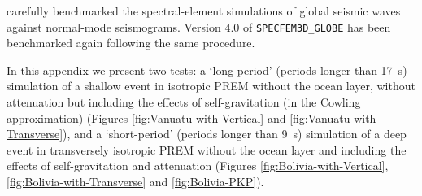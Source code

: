\documentclass[oneside,english]{book}
\begin{document}
\citet{KoTr02a,KoTr02b} carefully benchmarked the spectral-element
simulations of global seismic waves against normal-mode seismograms.
Version 4.0 of \texttt{SPECFEM3D\_GLOBE} has been benchmarked again
following the same procedure.

In this appendix we present two tests: a `long-period' (periods longer
than 17~s) simulation of a shallow event in isotropic PREM \citep{DzAn81}
without the ocean layer, without attenuation but including the effects
of self-gravitation (in the Cowling approximation) (Figures \ref{fig:Vanuatu-with-Vertical}
and \ref{fig:Vanuatu-with-Transverse}), and a `short-period' (periods
longer than 9~s) simulation of a deep event in transversely isotropic
PREM without the ocean layer and including the effects of self-gravitation
and attenuation (Figures \ref{fig:Bolivia-with-Vertical}, \ref{fig:Bolivia-with-Transverse}
and \ref{fig:Bolivia-PKP}).
\end{document}
